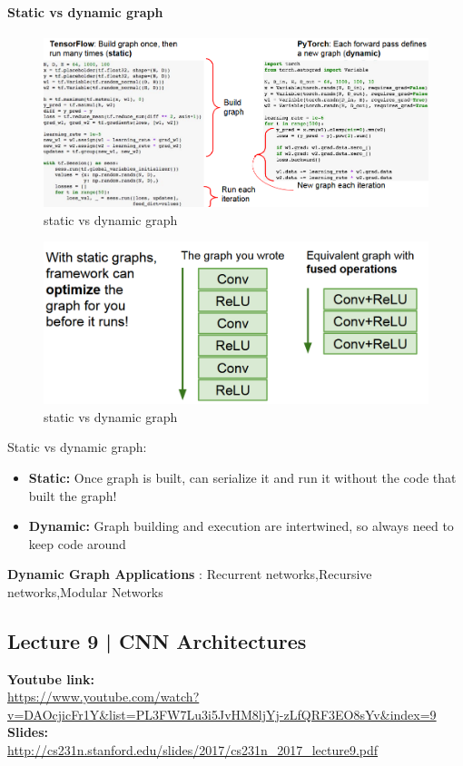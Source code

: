 \documentclass[11pt]{article}
\begin{document}
\clearpage
\paragraph{Static vs dynamic graph}
\begin{figure}[h]
\centering
\captionsetup{justification=centering}
\includegraphics[width=1\linewidth]{L719.pdf}
\caption{ static vs dynamic graph}
\label{fig:L719}
\end{figure}
\begin{figure}[h]
\centering
\captionsetup{justification=centering}
\includegraphics[width=1\linewidth]{L720.pdf}
\caption{ static vs dynamic graph}
\label{fig:L720}
\end{figure}
Static vs dynamic graph:
\begin{itemize}
    \item \textbf{Static:} Once graph is built, can serialize it and run it without the code that built the graph!
    \item \textbf{Dynamic:} Graph building and execution are intertwined, so always need to keep code around
\end{itemize}{}

\textbf{Dynamic Graph Applications} : Recurrent networks,Recursive networks,Modular Networks


\clearpage

\subsection{Lecture 9 | CNN Architectures}
\textbf{Youtube link:}\\
\url{https://www.youtube.com/watch?v=DAOcjicFr1Y&list=PL3FW7Lu3i5JvHM8ljYj-zLfQRF3EO8sYv&index=9}\\
\textbf{Slides:}\\
\url{http://cs231n.stanford.edu/slides/2017/cs231n_2017_lecture9.pdf}
\end{document}
